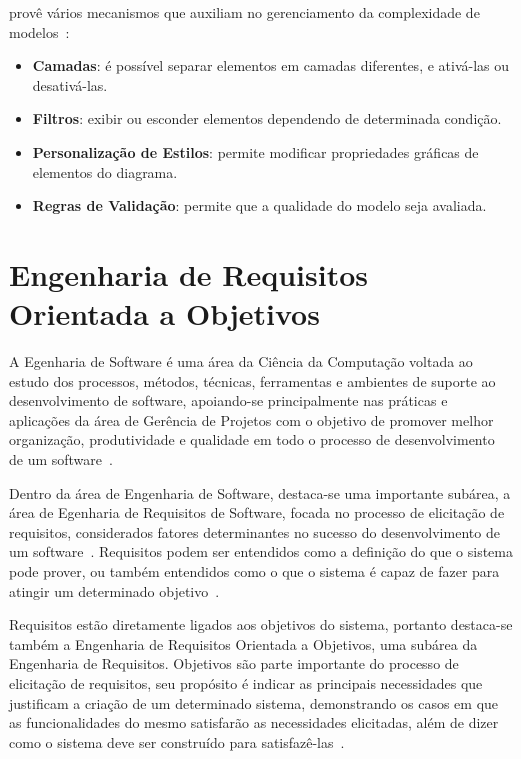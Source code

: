 \sirius provê vários mecanismos que auxiliam no gerenciamento da complexidade de modelos~\cite{madiot2015eclipse}:

\begin{itemize}
	\item \textbf{Camadas}: é possível separar elementos em camadas diferentes, e ativá-las ou desativá-las.
	\item \textbf{Filtros}: exibir ou esconder elementos dependendo de determinada condição.
	\item \textbf{Personalização de Estilos}: permite modificar propriedades gráficas de elementos do diagrama.
	\item \textbf{Regras de Validação}: permite que a qualidade do modelo seja avaliada.
\end{itemize}



\section{Engenharia de Requisitos Orientada a Objetivos}
\label{sec-referencial-engenharia-objetivos}

A Egenharia de Software é uma área da Ciência da Computação voltada ao estudo dos processos, métodos, técnicas, ferramentas e ambientes de suporte ao desenvolvimento de software, apoiando-se principalmente nas práticas e aplicações da área de Gerência de Projetos com o objetivo de promover melhor organização, produtividade e qualidade em todo o processo de desenvolvimento de um software~\cite{falboEngSoft}.

Dentro da área de Engenharia de Software, destaca-se uma importante subárea, a área de Egenharia de Requisitos de Software, focada no processo de elicitação de requisitos, considerados fatores determinantes no sucesso do desenvolvimento de um software~\cite{falboEngReq}. Requisitos podem ser entendidos como a definição do que o sistema pode prover, ou também entendidos como o que o sistema é capaz de fazer para atingir um determinado objetivo~\cite{pfleeger2004engenharia}.

Requisitos estão diretamente ligados aos objetivos do sistema, portanto destaca-se também a Engenharia de Requisitos Orientada a Objetivos, uma subárea da Engenharia de Requisitos. Objetivos são parte importante do processo de elicitação de requisitos, seu propósito é indicar as principais necessidades que justificam a criação de um determinado sistema, demonstrando os casos em que as funcionalidades do mesmo satisfarão as necessidades elicitadas, além de dizer como o sistema deve ser construído para satisfazê-las~\cite{ross1977structured}. 


